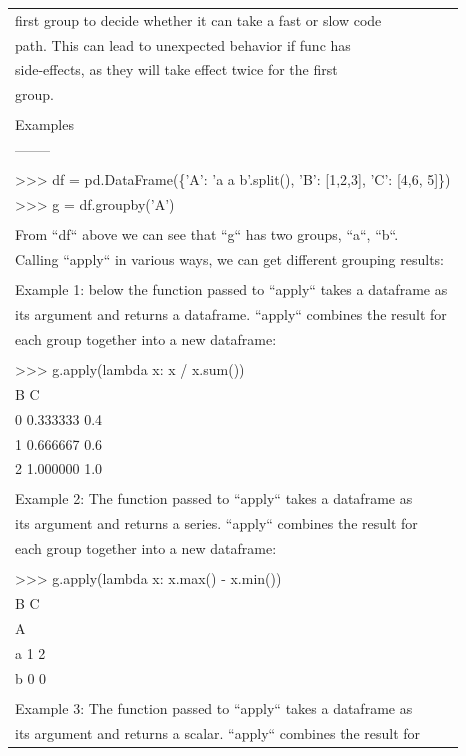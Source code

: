 \documentclass[11pt]{article}
\begin{document}
\begin{enumerate}
\begin{enumerate}
\begin{enumerate}
\begin{center}
\begin{tabular}{l}
first group to decide whether it can take a fast or slow code\\
path. This can lead to unexpected behavior if func has\\
side-effects, as they will take effect twice for the first\\
group.\\
\\
Examples\\
--------\\
\\
>>> df = pd.DataFrame(\{'A': 'a a b'.split(), 'B': [1,2,3], 'C': [4,6, 5]\})\\
>>> g = df.groupby('A')\\
\\
From ``df`` above we can see that ``g`` has two groups, ``a``, ``b``.\\
Calling ``apply`` in various ways, we can get different grouping results:\\
\\
Example 1: below the function passed to ``apply`` takes a dataframe as\\
its argument and returns a dataframe. ``apply`` combines the result for\\
each group together into a new dataframe:\\
\\
>>> g.apply(lambda x: x / x.sum())\\
B    C\\
0  0.333333  0.4\\
1  0.666667  0.6\\
2  1.000000  1.0\\
\\
Example 2: The function passed to ``apply`` takes a dataframe as\\
its argument and returns a series.  ``apply`` combines the result for\\
each group together into a new dataframe:\\
\\
>>> g.apply(lambda x: x.max() - x.min())\\
B  C\\
A\\
a  1  2\\
b  0  0\\
\\
Example 3: The function passed to ``apply`` takes a dataframe as\\
its argument and returns a scalar. ``apply`` combines the result for\\

\end{tabular}
\end{center}
\end{enumerate}
\end{enumerate}
\end{enumerate}
\end{document}
